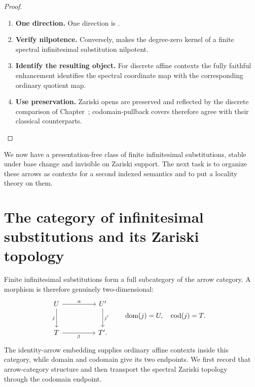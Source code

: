 \begin{proof}
\leavevmode
\begin{enumerate}[label=\textup{(\arabic*)}]
    \item \textbf{One direction.}
    One direction is .

    \item \textbf{Verify nilpotence.}
    Conversely,  makes the degree-zero kernel of a
    finite spectral infinitesimal substitution nilpotent.

    \item \textbf{Identify the resulting object.}
    For discrete affine contexts the fully faithful enhancement identifies the spectral
    coordinate map with the corresponding ordinary quotient map.

    \item \textbf{Use preservation.}
    Zariski opens are preserved and reflected by the discrete comparison of
    Chapter~; codomain-pullback covers therefore agree
    with their classical counterparts.
\end{enumerate}
\end{proof}
We now have a presentation-free class of finite infinitesimal substitutions,
stable under base change and invisible on Zariski support. The next task is to
organize these arrows as contexts for a second indexed semantics and to put a
locality theory on them.

\section{The category of infinitesimal substitutions and its Zariski topology}
\label{sec:infinitesimal-arrow-category}

Finite infinitesimal substitutions form a full subcategory of the arrow
category. A morphism is therefore genuinely two-dimensional:
\[
\begin{tikzcd}[column sep=huge,row sep=large]
U \arrow[r,"\alpha"] \arrow[d,"j"']
    & U' \arrow[d,"j'"]
\\
T \arrow[r,"\beta"']
    & T'.
\end{tikzcd}
\qquad
\operatorname{dom}(j)=U,
\quad
\operatorname{cod}(j)=T.
\]
The identity-arrow embedding supplies ordinary affine contexts inside this
category, while domain and codomain give its two endpoints. We first record
that arrow-category structure and then transport the spectral Zariski topology
through the codomain endpoint.


